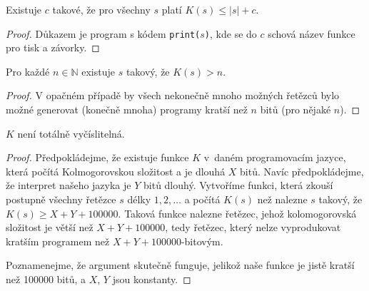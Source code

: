 \begin{theorem}
    Existuje $c$ takové, že pro všechny $s$ platí
    $K(s) \leq |s| + c$.
\end{theorem}

\begin{proof}
Důkazem je program s kódem \verb|print(|$s$\verb|)|, kde se do $c$
schová název funkce pro tisk a závorky.
\end{proof}

\begin{theorem}
    Pro každé $n \in \mathbb{N}$ existuje $s$ takový, že $K(s) > n$.
\end{theorem}

\begin{proof}
V opačném případě by všech nekonečně mnoho možných řetězců bylo možné
generovat (konečně mnoha) programy kratší než $n$ bitů (pro nějaké $n$).
\end{proof}

\pagebreak

\begin{theorem}
    $K$ není totálně vyčíslitelná.
\end{theorem}

\begin{proof}
Předpokládejme, že existuje funkce $K$ v~daném programovacím jazyce,
která počítá Kolmogorovskou složitost
a je dlouhá $X$ bitů. Navíc předpokládejme, že interpret našeho jazyka
je $Y$ bitů dlouhý. Vytvoříme funkci, která zkouší postupně všechny řetězce $s$ délky
$1,2,\ldots$ a počítá $K(s)$ než nalezne $s$ takový, že $K(s) \geq
X+Y+100000$. Taková funkce nalezne řetězec, jehož kolomogorovská
složitost je větší než $X+Y+100000$, tedy řetězec, který nelze
vyprodukovat kratším programem než $X+Y+100000$-bitovým.

Poznamenejme, že argument skutečně funguje, jelikož naše funkce je jistě
kratší než 100000 bitů, a $X$, $Y$ jsou konstanty.
\end{proof}


